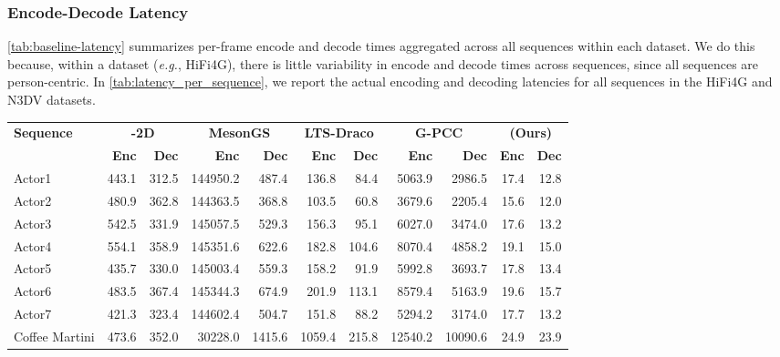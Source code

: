 \subsubsection{Encode-Decode Latency}\label{sec:latency}

\cref{tab:baseline-latency} summarizes per-frame encode and decode times aggregated across all sequences within each dataset.
%
We do this because, within a dataset (\textit{e.g.}, HiFi4G), there is little variability in encode and decode times across sequences, since all sequences are person-centric.
%
In \cref{tab:latency_per_sequence}, we report the actual encoding and decoding latencies for all sequences in the HiFi4G and N3DV datasets.

\begin{table}[t]
  \centering
  \scalebox{0.94}
  {
    \begin{tabular}{l|rr|rr|rr|rr|rr}
    \toprule
    \textbf{Sequence} & \multicolumn{2}{c|}{\textbf{\vthree{}-2D}} & \multicolumn{2}{c|}{\textbf{MesonGS}} & \multicolumn{2}{c|}{\textbf{LTS-Draco}} & \multicolumn{2}{c|}{\textbf{G-PCC}} & \multicolumn{2}{c}{\textbf{\gsnfs{} (Ours)}} \\
            & \textbf{Enc} & \textbf{Dec} & \textbf{Enc} & \textbf{Dec} & \textbf{Enc} & \textbf{Dec} & \textbf{Enc} & \textbf{Dec} & \textbf{Enc} & \textbf{Dec} \\
    \hline
    Actor1    & 443.1  & 312.5 & 144950.2 & 487.4 & 136.8  & 84.4  & 5063.9  & 2986.5  & 17.4 & 12.8 \\
    Actor2    & 480.9  & 362.8 & 144363.5 & 368.8 & 103.5  & 60.8  & 3679.6  & 2205.4  & 15.6 & 12.0 \\
    Actor3    & 542.5  & 331.9 & 145057.5 & 529.3 & 156.3  & 95.1  & 6027.0  & 3474.0  & 17.6 & 13.2 \\
    Actor4    & 554.1  & 358.9 & 145351.6 & 622.6 & 182.8  & 104.6 & 8070.4  & 4858.2  & 19.1 & 15.0 \\
    Actor5    & 435.7  & 330.0 & 145003.4 & 559.3 & 158.2  & 91.9  & 5992.8  & 3693.7  & 17.8 & 13.4 \\
    Actor6    & 483.5  & 367.4 & 145344.3 & 674.9 & 201.9  & 113.1 & 8579.4  & 5163.9  & 19.6 & 15.7 \\
    Actor7    & 421.3  & 323.4 & 144602.4 & 504.7 & 151.8  & 88.2  & 5294.2  & 3174.0  & 17.7 & 13.2 \\
    \midrule
    Coffee Martini   & 473.6 & 352.0 & 30228.0 & 1415.6 & 1059.4 & 215.8 & 12540.2 & 10090.6 & 24.9 & 23.9 \\

\end{tabular}}
\end{table}
